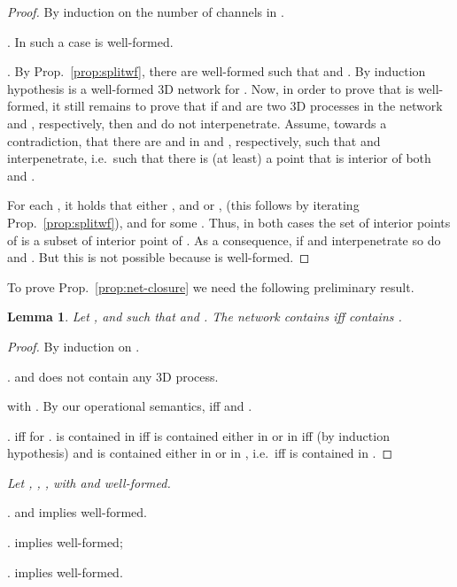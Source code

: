 \documentclass[11pt]{article}
\newtheorem{lemma}{Lemma}
\begin{document}
\begin {proof}
By induction on the number of channels in .
\par\medskip\noindent
. In such a case   is  well-formed.
\par\medskip\noindent
. By
Prop.~\ref{prop:splitwf}, there are  well-formed such that  and . By induction hypothesis  is a well-formed 3D network for . Now, in
order to prove that  is  well-formed, it still remains to prove that if 
and  are two 3D processes in the network  and ,  respectively, then  and 
do not interpenetrate.
Assume, towards a contradiction, that there are  and  in  and , respectively,
such that  and  interpenetrate, i.e.\ such that there is (at least) a point 
that is interior of both  and .

For each , it holds that either ,   and  or ,  (this follows by iterating\\ 
Prop.~\ref{prop:splitwf}), 
and  for some . Thus, in both cases the set of interior
points of  is a subset of interior point of . As a consequence, if
 and  interpenetrate so do  and . But this is not possible because
 is well-formed.
\end {proof}
To prove Prop.~\ref{prop:net-closure} we need the following preliminary result.
\begin{lemma}\label{lemma:net-time}
Let ,  and  such that  and . The network  contains  iff  contains .
\end{lemma}

\begin{proof}
By induction on .
\par\smallskip\noindent
.   and  does not contain any 3D
process.
\par\smallskip\noindent
  with . By our operational semantics,  iff  and
.
\par\smallskip\noindent 
.   iff   for .
 is contained in  iff  is contained either in  or in  iff (by induction
hypothesis) and  is contained either in  or in , i.e.\ iff  is contained in .
\end{proof}

\par\medskip{}
\em Let , , , with  and  well-formed.

\par\smallskip{}.  and  implies 
well-formed.

\par\smallskip{}.  implies  well-formed;

\par\medskip{}.  implies  well-formed.\rm
\end{document}

